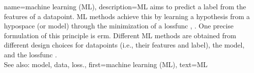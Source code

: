 {name={machine learning (ML)},
	description={ML aims to predict 
	 	a \gls{label} from the \glspl{feature} of a \gls{datapoint}. ML methods achieve 
	 	this by learning a \gls{hypothesis} from a \gls{hypospace} (or \gls{model}) 
	 	through the minimization of a \gls{lossfunc} \cite{MLBasics}, \cite{HastieWainwrightBook}. 
	 	One precise formulation of this principle is \gls{erm}. Different ML methods are 
	 	obtained from different design choices for \glspl{datapoint} (i.e., their \glspl{feature} and \gls{label}), 
	 	the \gls{model}, and the \gls{lossfunc} \cite[Ch. 3]{MLBasics}.
	 			\\ 
		See also: \gls{model}, \gls{data}, \gls{loss}.},
	first={machine learning (ML)},
	text={ML}
} 


